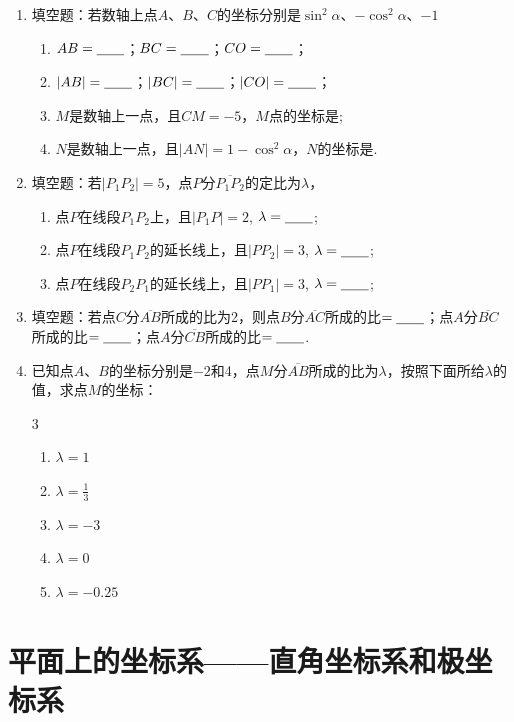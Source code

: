 \begin{ex}
\begin{enumerate}
    \item 填空题：若数轴上点$A$、$B$、$C$的坐标分别是$\sin^2\alpha$、$-\cos^2\alpha$、$-1$
\begin{enumerate}[(1)]
    \item $AB=\underline{\qquad}$；$BC=\underline{\qquad}$；$CO=\underline{\qquad}$；
    \item $|AB|=\underline{\qquad}$；$|BC|=\underline{\qquad}$；$|CO|=\underline{\qquad}$；
    \item $M$是数轴上一点，且$CM=-5$，$M$点的坐标是\blank;
    \item $N$是数轴上一点，且$|AN|=1-\cos^2\alpha$，$N$的坐标是\blank.
\end{enumerate}
\item 填空题：若$|P_1P_2|=5$，点$P$分$\overline{P_1P_2}$的定比为$\lambda$，
\begin{enumerate}[(1)]
    \item 点$P$在线段$P_1P_2$上，且$|P_1P|=2$, $\lambda=\underline{\qquad}$;
    \item  点$P$在线段$P_1P_2$的延长线上，且$|PP_2|=3$, $\lambda=\underline{\qquad}$;
    \item 点$P$在线段$P_2P_1$的延长线上，且$|PP_1|=3$, $\lambda=\underline{\qquad}$;
\end{enumerate}
\item 填空题：若点$C$分$\overline{AB}$所成的比为2，则点$B$分$\overline{AC}$所成的比$=\underline{\qquad}$；点$A$分$\overline{BC}$所成的比$=\underline{\qquad}$；点$A$分$\overline{CB}$所成的比$=\underline{\qquad}$.
\item 已知点$A$、$B$的坐标分别是$-2$和4，点$M$分$\overline{AB}$所成的比为$\lambda$，按照下面所给$\lambda$的值，求点$M$的坐标：
\begin{multicols}{3}
\begin{enumerate}[(1)]
    \item $\lambda= 1$
    \item $\lambda= \frac{1}{3}$
    \item $\lambda= -3$
    \item $\lambda= 0$
    \item $\lambda= -0.25$
\end{enumerate}
\end{multicols}
\end{enumerate}
\end{ex}

\section{平面上的坐标系——直角坐标系和极坐标系}

